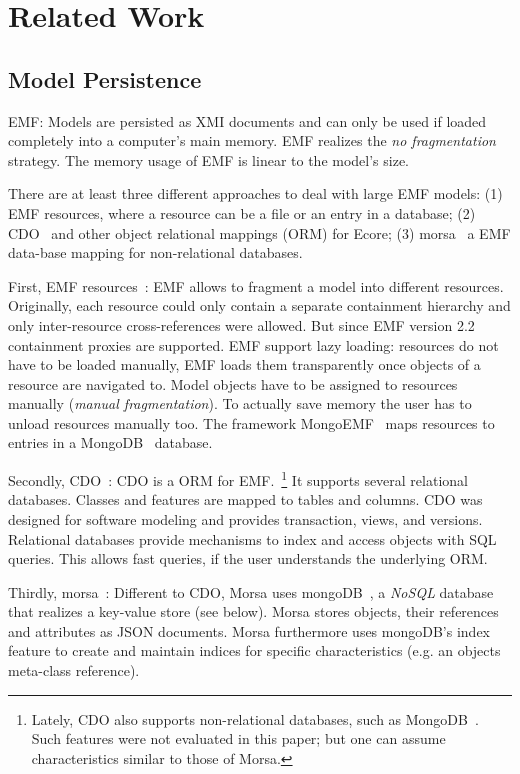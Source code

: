 \section{Related Work}
\label{sec:related_work}

\subsection{Model Persistence}
EMF: Models are persisted as XMI documents and can only be used if loaded completely into a computer's main memory. EMF realizes the \emph{no fragmentation} strategy. The memory usage of EMF is linear to the model's size.

There are at least three different approaches to deal with large EMF models: (1) EMF resources, where a resource can be a file or an entry in a database; (2) CDO~\cite{cdo} and other object relational mappings (ORM) for Ecore; (3) morsa~\cite{morsa2011} a EMF data-base mapping for non-relational databases.

First, EMF resources~\cite{emf2009}: EMF allows to fragment a model into different resources. Originally, each resource could only contain a separate containment hierarchy and only inter-resource cross-references were allowed. But since EMF version 2.2 containment proxies are supported. EMF support lazy loading: resources do not have to be loaded manually, EMF loads them transparently once objects of a resource are navigated to. Model objects have to be assigned to resources manually (\emph{manual fragmentation}). To actually save memory the user has to unload resources manually too. The framework MongoEMF~\cite{mongoEMF} maps resources to entries in a MongoDB~\cite{mongodb2010} database.

Secondly, CDO~\cite{cdo}: CDO is a ORM for EMF.~\footnote{Lately, CDO also supports non-relational databases, such as MongoDB~\cite{mongodb2010}. Such features were not evaluated in this paper; but one can assume characteristics similar to those of Morsa.}
It supports several relational databases. Classes and features are mapped to tables and columns. CDO was designed for software modeling and provides transaction, views, and versions.
Relational databases provide mechanisms to index and access objects with SQL queries. This allows fast queries, if the user understands the underlying ORM.

Thirdly, morsa~\cite{morsa2011}: Different to CDO, Morsa uses mongoDB~\cite{mongodb2010}, a \emph{NoSQL} database that realizes a key-value store (see below). Morsa stores objects, their references and attributes as JSON documents. Morsa furthermore uses mongoDB's index feature to create and maintain indices for specific characteristics (e.g. an objects meta-class reference).

